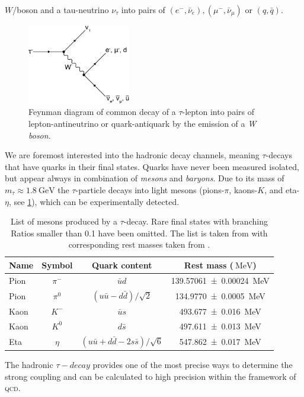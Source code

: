 \documentclass[../../index.tex]{subfiles}
\begin{document}
$W$\-/boson and a tau-neutrino $\nu_\tau$ into pairs of $(e^-, \bar\nu_e),
(\mu^-, \bar\nu_\mu)$ or $(q, \bar q)$.
\begin{figure}
  \centering \includegraphics[width=0.4\textwidth]{images/tauDecay.eps}
  \caption{Feynman diagram of common decay of a $\tau$-lepton into pairs of
    lepton-antineutrino or quark-antiquark by the emission of a \textit{W
      boson}.}
  \label{fig:tauDecay}
\end{figure}
We are foremost interested into the hadronic decay channels, meaning
$\tau$-decays that have quarks in their final states. Quarks have never been
measured isolated, but appear always in combination of \textit{mesons} and
\textit{baryons}. Due to its mass of $m_\tau \approx
\SI{1.8}{\giga\electronvolt}$ the $\tau$-particle decays into light mesons
(pions-$\pi$, kaons-$K$, and eta-$\eta$, see \cref{table:lightMesons}), which
can be experimentally detected.
\begin{table}
  \centering
  \begin{tabular}{lccc}
    \toprule
    Name & Symbol & Quark content & Rest mass ($\SI{}{\mega\electronvolt}$) \\
    \midrule
    Pion & $\pi^-$ & $\bar u d$ & \SI{139.57061 \pm 0.00024}{\mega\electronvolt}  \\
    Pion & $\pi^0$ & $(u \bar u - d \bar d)/\sqrt{2}$ & \SI{134.9770\pm0.0005}{\mega\electronvolt} \\
    Kaon & $K^-$ & $\bar u s$ & \SI{493.677\pm0.016}{\mega\electronvolt} \\
    Kaon & $K^0$ & $d \bar s$ & \SI{497.611\pm0.013}{\mega\electronvolt} \\
    Eta & $\eta$ & $(u \bar u + d \bar d - 2 s \bar s)/\sqrt{6}$ & \SI{547.862\pm0.017}{\mega\electronvolt} \\
  \end{tabular}
  \caption{List of mesons produced by a $\tau$-decay. Rare final states with
    branching Ratios smaller than 0.1 have been omitted. The list is taken from
    \cite{Davier2006} with corresponding rest masses taken from \cite{PDG2018}.}
  \label{table:lightMesons}
\end{table}
The hadronic $\tau-decay$ provides one of the most precise ways to determine the
strong coupling \cite{Pich2016} and can be calculated to high precision within
the framework of \textsc{qcd}.
\end{document}

